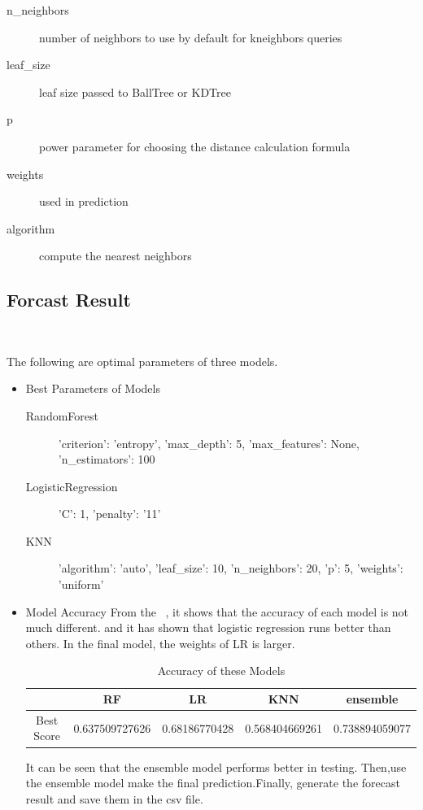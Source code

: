 \begin{description}
	\item[n_neighbors] number of neighbors to use 
	by default for kneighbors queries
	\item[leaf_size] leaf size passed to BallTree or KDTree
	\item[p] power parameter for choosing 
	the distance calculation formula
	\item[weights] used in prediction
	\item[algorithm] compute the nearest neighbors
\end{description}

	
\subsection{Forcast Result}

\

The following are optimal parameters of three models. 

\begin{itemize}
	\item Best Parameters of Models
	\begin{description}
		\item[RandomForest] 'criterion': 'entropy', 'max\_depth': 5, 
		'max\_features': None, 'n\_estimators': 100
		\item[LogisticRegression] 'C': 1, 'penalty': '11'
	
		\item[KNN] 'algorithm': 'auto', 'leaf\_size': 10, 
		'n\_neighbors': 20, 'p': 5, 'weights': 'uniform'

	\end{description}
	
	
\item Model Accuracy 
\newline
From the  ~,
it shows that the accuracy of 
each model is not much different.
and  it has shown that logistic regression runs better than others.
In the final model, the weights of LR is larger.

	\begin{table}[h]  
		\centering
		\caption{Accuracy of these Models}
		\label{tbl:best_score_base_models_old}
		\begin{tabular}{ccccc}
			\toprule
			& RF  & LR  & KNN & ensemble\\
			\midrule
			Best Score & 0.637509727626  & 0.68186770428  & 0.568404669261 & 0.738894059077\\
			\bottomrule
		\end{tabular}
	\end{table}
It can be seen that the ensemble model performs better in testing.
Then,use the ensemble model make the final prediction.Finally, generate the forecast result and save them in the csv file.
\end{itemize}
\newpage



